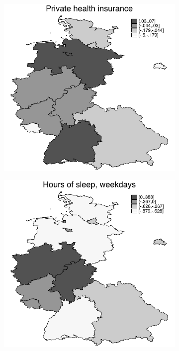 \documentclass[a4paper ]{article}
\begin{document}
\begin{figure}[p]
\begin{subfigure}[h]{0.4\textwidth}\centering
	\includegraphics[width=\textwidth]{../../analysis/graphs/SOEP/LOCD_privHI.pdf}
\end{subfigure}
\quad
\begin{subfigure}[h]{0.4\textwidth}\centering
	\includegraphics[width=\textwidth]{../../analysis/graphs/SOEP/LOChrsleep_wrk.pdf}
\end{subfigure}
\par\medskip


\end{figure}
\end{document}

